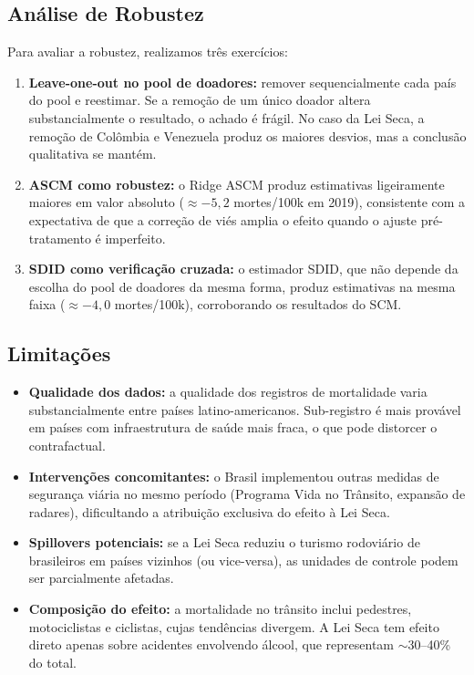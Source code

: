 \documentclass[12pt, a4paper, openany]{book}
\begin{document}
\subsection{Análise de Robustez}

Para avaliar a robustez, realizamos três exercícios:

\begin{enumerate}[leftmargin=1.5cm]
  \item \textbf{Leave-one-out no pool de doadores:} remover sequencialmente cada país do pool e reestimar. Se a remoção de um único doador altera substancialmente o resultado, o achado é frágil. No caso da Lei Seca, a remoção de Colômbia e Venezuela produz os maiores desvios, mas a conclusão qualitativa se mantém.
  
  \item \textbf{ASCM como robustez:} o Ridge ASCM produz estimativas ligeiramente maiores em valor absoluto ($\approx -5{,}2$ mortes/100k em 2019), consistente com a expectativa de que a correção de viés amplia o efeito quando o ajuste pré-tratamento é imperfeito.
  
  \item \textbf{SDID como verificação cruzada:} o estimador SDID, que não depende da escolha do pool de doadores da mesma forma, produz estimativas na mesma faixa ($\approx -4{,}0$ mortes/100k), corroborando os resultados do SCM.
\end{enumerate}

\subsection{Limitações}

\begin{itemize}[leftmargin=1.5cm]
  \item \textbf{Qualidade dos dados:} a qualidade dos registros de mortalidade varia substancialmente entre países latino-americanos. Sub-registro é mais provável em países com infraestrutura de saúde mais fraca, o que pode distorcer o contrafactual.
  
  \item \textbf{Intervenções concomitantes:} o Brasil implementou outras medidas de segurança viária no mesmo período (Programa Vida no Trânsito, expansão de radares), dificultando a atribuição exclusiva do efeito à Lei Seca.
  
  \item \textbf{Spillovers potenciais:} se a Lei Seca reduziu o turismo rodoviário de brasileiros em países vizinhos (ou vice-versa), as unidades de controle podem ser parcialmente afetadas.
  
  \item \textbf{Composição do efeito:} a mortalidade no trânsito inclui pedestres, motociclistas e ciclistas, cujas tendências divergem. A Lei Seca tem efeito direto apenas sobre acidentes envolvendo álcool, que representam $\sim$30--40\% do total.
\end{itemize}
\end{document}
